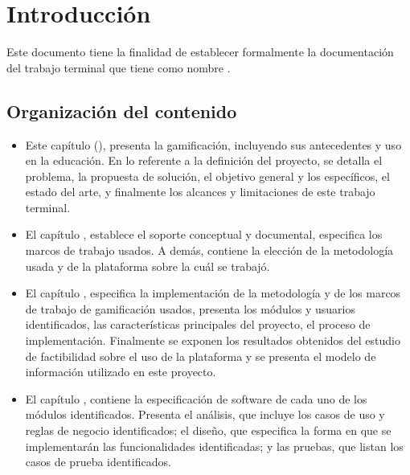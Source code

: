 \chapter{Introducción}
\label{ch:introduccion}

 Este documento tiene la finalidad de establecer formalmente la documentación del
 trabajo terminal {\numeroTT} que tiene como nombre {\bf\tituloTT}.

\section{Organización del contenido}

    \begin{itemize}
        \item Este capítulo (), presenta la
        gamificación, incluyendo sus antecedentes y uso en la educación. En lo
        referente a la definición del proyecto, se detalla el problema, la propuesta
        de solución, el objetivo general y los específicos, el estado del arte, y
        finalmente los alcances y limitaciones de este trabajo terminal.

        \item El capítulo , establece el soporte conceptual
        y documental, especifica los marcos de trabajo usados. A demás, contiene la
        elección de la metodología usada y de la plataforma sobre la cuál se
        trabajó.

        \item El capítulo , especifica la implementación de la
        metodología y de los marcos de trabajo de gamificación usados, presenta los
        módulos y usuarios identificados, las características principales del
        proyecto, el proceso de implementación. Finalmente se exponen los resultados
        obtenidos del estudio de factibilidad sobre el uso de la plataforma y se
        presenta el modelo de información utilizado en este proyecto.

        \item El capítulo , contiene la especificación de
        software de cada uno de los módulos identificados. Presenta el análisis,
        que incluye los casos de uso y reglas de negocio identificados; el diseño,
        que especifica la forma en que se implementarán las funcionalidades
        identificadas; y las pruebas, que listan los casos de prueba identificados.

    \end{itemize}


